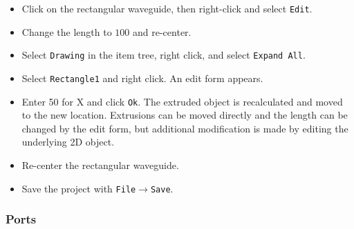 \documentclass[titlepage]{article}
\renewcommand\_{\textunderscore\linebreak[1]}
\begin{document}
\begin{itemize}
\item Click on the rectangular waveguide, then right-click and select \texttt{Edit}.
\item Change the length to $100$ and re-center.
\item Select \texttt{Drawing} in the item tree, right click, and select \texttt{Expand All}.
\item Select \texttt{Rectangle1} and right click.  An edit form appears.
\item Enter 50 for X and click \texttt{Ok}.  The extruded object is recalculated and moved to the new location.  Extrusions can be moved directly and the length can be changed by the edit form, but additional modification is made by editing the underlying 2D object.
\item Re-center the rectangular waveguide.
\item Save the project with \texttt{File}$\rightarrow$\texttt{Save}.

\end{itemize}

\subsubsection{Ports}
\end{document}
